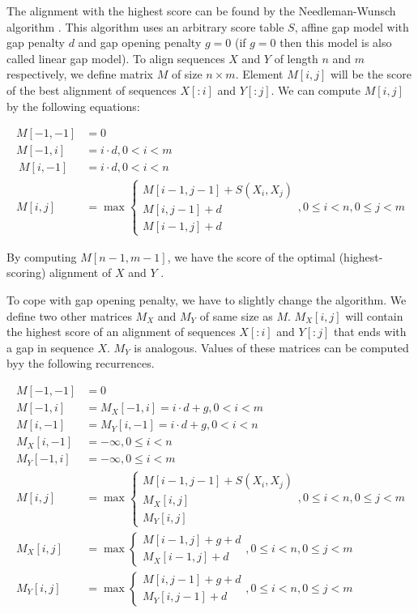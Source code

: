 The
alignment with the highest score can be found by the Needleman-Wunsch algorithm \cite{Durbin1998}.
This algorithm uses an arbitrary score table $S$, affine gap model with gap penalty
$d$ and gap opening penalty $g=0$ (if $g=0$ then this model is also called
linear gap model). To align sequences $X$ and $Y$ of length $n$ and $m$
respectively, we define matrix $M$ of size $n\times m$. Element $M[i,j]$ will be the
score of the best alignment of sequences $X[:i]$ and $Y[:j]$. We can compute
$M[i,j]$ by the following equations:

\begin{align} 
M[-1,-1] &= 0\\
M[-1,i] &= i\cdot d, 0< i < m\\\
M[i,-1] &= i\cdot d, 0< i < n\\
M[i,j] &= \max
\begin{cases}
 M[i-1,j-1]+S(X_i,X_j)\\M[i,j-1]+d\\
 M[i-1,j]+d
\end{cases}, 0\leq i<n,0\leq j<m \label{ALIGN:ALGO:AFFINE}
\end{align}

By computing $M[n-1,m-1]$, we have the score of the optimal (highest-scoring) alignment of $X$ and $Y$ \cite{Durbin1998}. 

To cope with gap opening penalty, we have to slightly change the algorithm.
We define two other matrices $M_X$ and $M_Y$ of same size as $M$. $M_X[i,j]$
will contain the highest score of an alignment of sequences $X[:i]$ and $Y[:j]$
that ends
with a gap in sequence $X$. $M_Y$ is analogous. Values of these matrices can be computed byy the following recurrences.

\begin{align}
M[-1,-1] &= 0\\
M[-1,i] &= M_X[-1,i] = i\cdot d+g, 0 < i < m\\
M[i,-1] &= M_Y[i,-1] = i\cdot d+g, 0 < i < n\\
M_X[i,-1] &= -\infty, 0\leq i< n\\
M_Y[-1,i] &= -\infty, 0 \leq i< m\\
M[i,j] &= \max
\begin{cases}\label{ALIGN:ALGO:REALAFFINESTART}
 M[i-1,j-1]+S(X_i,X_j)\\
 M_X[i,j]\\
 M_Y[i,j]
\end{cases}, 0\leq i<n,0\leq j<m\\
M_X[i,j] &= \max
\begin{cases}
M[i-1,j]+g+d\\
M_X[i-1,j]+d
\end{cases}, 0\leq i<n,0\leq j<m\\
M_Y[i,j] &= \max
\begin{cases}
M[i,j-1]+g+d\\
M_Y[i,j-1]+d
\end{cases}, 0\leq i<n,0\leq j<m\label{ALIGN:ALGO:REALAFFINEEND}
\end{align}

